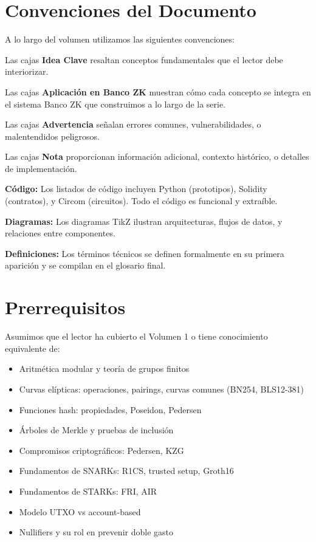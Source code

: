 \documentclass[11pt,a4paper,twoside]{book}
\theoremstyle{definition}
\theoremstyle{remark}
\begin{document}
\section*{Convenciones del Documento}

A lo largo del volumen utilizamos las siguientes convenciones:

\begin{keyidea}
Las cajas \textbf{Idea Clave} resaltan conceptos fundamentales que el lector debe interiorizar.
\end{keyidea}

\begin{bancozk}
Las cajas \textbf{Aplicación en Banco ZK} muestran cómo cada concepto se integra en el sistema Banco ZK que construimos a lo largo de la serie.
\end{bancozk}

\begin{warning}
Las cajas \textbf{Advertencia} señalan errores comunes, vulnerabilidades, o malentendidos peligrosos.
\end{warning}

\begin{note}
Las cajas \textbf{Nota} proporcionan información adicional, contexto histórico, o detalles de implementación.
\end{note}

\textbf{Código:} Los listados de código incluyen Python (prototipos), Solidity (contratos), y Circom (circuitos). Todo el código es funcional y extraíble.

\textbf{Diagramas:} Los diagramas TikZ ilustran arquitecturas, flujos de datos, y relaciones entre componentes.

\textbf{Definiciones:} Los términos técnicos se definen formalmente en su primera aparición y se compilan en el glosario final.

\section*{Prerrequisitos}

Asumimos que el lector ha cubierto el Volumen 1 o tiene conocimiento equivalente de:

\begin{itemize}
    \item Aritmética modular y teoría de grupos finitos
    \item Curvas elípticas: operaciones, pairings, curvas comunes (BN254, BLS12-381)
    \item Funciones hash: propiedades, Poseidon, Pedersen
    \item Árboles de Merkle y pruebas de inclusión
    \item Compromisos criptográficos: Pedersen, KZG
    \item Fundamentos de SNARKs: R1CS, trusted setup, Groth16
    \item Fundamentos de STARKs: FRI, AIR
    \item Modelo UTXO vs account-based
    \item Nullifiers y su rol en prevenir doble gasto
\end{itemize}
\end{document}

